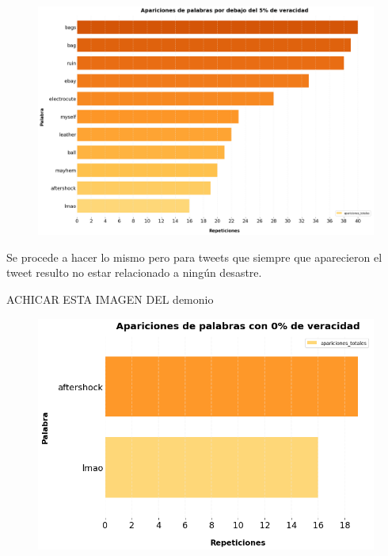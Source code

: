\documentclass[titlepage,a4paper]{article}
\begin{document}
    \begin{figure}[H]
    \centering
    \includegraphics[width=1\textwidth]{graficos/Analisis Lexico Grafico/apariciones_de_palabras_por_debajo_de_5_de_veracidad.png}
    \caption{} 
    \end{figure}
    
    Se procede a hacer lo mismo pero para tweets que siempre que aparecieron el tweet resulto no estar relacionado a ningún desastre.
    
    ACHICAR ESTA IMAGEN DEL demonio
    
    \begin{figure}[H]
    \centering
    \includegraphics[width=1\textwidth]{graficos/Analisis Lexico Grafico/aparaciones_de_palabras_con_0_de_veracidad.png}
    \caption{} 
    \end{figure}
    
\end{document}
